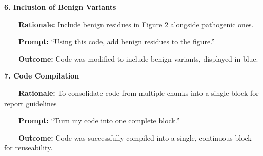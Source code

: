 \documentclass[
  twocolumn]{biophys-new-mod}
\begin{document}
\textbf{6. Inclusion of Benign Variants}\\
\strut ~~~~\textbf{Rationale:} Include benign residues in Figure 2
alongside pathogenic ones.\\
\strut ~~~~\textbf{Prompt:} ``Using this code, add benign residues to
the figure.''\\
\strut ~~~~\textbf{Outcome:} Code was modified to include benign
variants, displayed in blue.

\textbf{7. Code Compilation}\\
\strut ~~~~\textbf{Rationale:} To consolidate code from multiple chunks
into a single block for report guidelines\\
\strut ~~~~\textbf{Prompt:} ``Turn my code into one complete block.''\\
\strut ~~~~\textbf{Outcome:} Code was successfully compiled into a
single, continuous block for reuseability.
\end{document}

